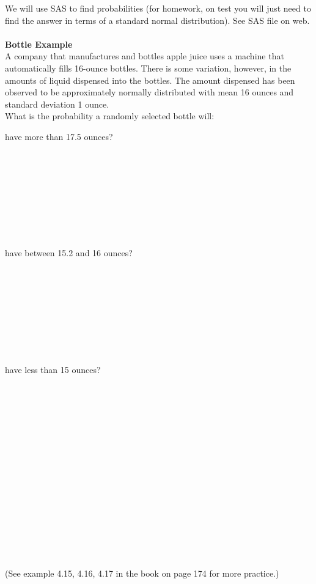 \pagebreak

We will use SAS to find probabilities (for homework, on test you will just need to find the answer in terms of a standard normal distribution).  See SAS file on web.\\~\\

\textbf{Bottle Example}\\
A company that manufactures and bottles apple juice uses a machine that automatically fills 16-ounce bottles.  There is some variation, however, in the amounts of liquid dispensed into the bottles.  The amount dispensed has been observed to be approximately normally distributed with mean 16 ounces and standard deviation 1 ounce. \\
What is the probability a randomly selected bottle will:
\bi
\item have more than 17.5 ounces?\\~\\~\\~\\~\\~\\~\\~\\~\\
\item have between 15.2 and 16 ounces?\\~\\~\\~\\~\\~\\~\\~\\~\\
\item have less than 15 ounces?\\~\\~\\~\\~\\~\\~\\~\\~\\~\\~\\~\\~\\~\\~\\~\\~\\
(See example 4.15, 4.16, 4.17 in the book on page 174 for more practice.)
\ei

